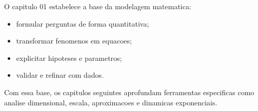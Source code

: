 \documentclass[12pt,a4paper,oneside]{book}
\theoremstyle{definition}
\begin{document}
O capitulo 01 estabelece a base da modelagem matematica:
\begin{itemize}
    \item formular perguntas de forma quantitativa;
    \item transformar fenomenos em equacoes;
    \item explicitar hipoteses e parametros;
    \item validar e refinar com dados.
\end{itemize}

Com essa base, os capitulos seguintes aprofundam ferramentas especificas como analise dimensional, escala, aproximacoes e dinamicas exponenciais.
\end{document}
